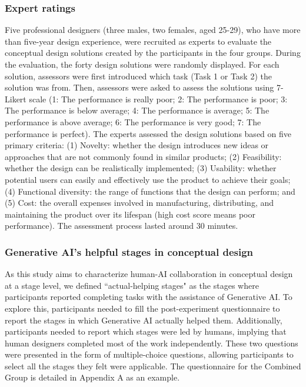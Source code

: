 \documentclass{dsj}
\begin{document}
\subsubsection{Expert ratings}
\label{subsubsection:expert_ratings}
Five professional designers (three males, two females, aged 25-29), who have more than five-year design experience, were recruited as experts to evaluate the conceptual design solutions created by the participants in the four groups. During the evaluation, the forty design solutions were randomly displayed. For each solution, assessors were first introduced which task (Task 1 or Task 2) the solution was from. Then, assessors were asked to assess the solutions using 7-Likert scale (1: The performance is really poor; 2: The performance is poor; 3: The performance is below average; 4: The performance is average; 5: The performance is above average; 6: The performance is very good; 7: The performance is perfect). The experts assessed the design solutions based on five primary criteria: (1) Novelty: whether the design introduces new ideas or approaches that are not commonly found in similar products; (2) Feasibility: whether the design can be realistically implemented; (3) Usability: whether potential users can easily and effectively use the product to achieve their goals; (4) Functional diversity: the range of functions that the design can perform; and (5) Cost: the overall expenses involved in manufacturing, distributing, and maintaining the product over its lifespan (high cost score means poor performance). The assessment process lasted around 30 minutes.

\subsubsection{Generative AI's helpful stages in conceptual design}
As this study aims to characterize human-AI collaboration in conceptual design at a stage level, we defined ``actual-helping stages" as the stages where participants reported completing tasks with the assistance of Generative AI. To explore this, participants needed to fill the post-experiment questionnaire to report the stages in which Generative AI actually helped them. Additionally, participants needed to report which stages were led by humans, implying that human designers completed most of the work independently. These two questions were presented in the form of multiple-choice questions, allowing participants to select all the stages they felt were applicable. The questionnaire for the Combined Group is detailed in Appendix A as an example. 
\end{document}
